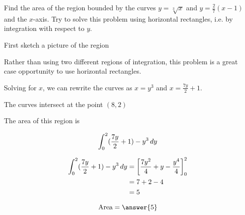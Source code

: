 \documentclass[handout]{ximera}
\begin{document}
\begin{exercise}
Find the area of the region bounded by the curves $y=\sqrt[3]{x}$ and $y=\frac{2}{7}(x-1)$ and the $x$-axis.  Try to solve this problem using horizontal rectangles, i.e. by integration with respect to $y$.

\begin{hint}

	First sketch a picture of the region

\begin{image}
\end{image}
\end{hint}

\begin{hint}
Rather than using two different regions of integration, this problem is a great case opportunity to use horizontal rectangles.

Solving for $x$, we can rewrite the curves as $x = y^3$ and $x = \frac{7y}{2}+1$.

The curves intersect at the point $(8,2)$
\end{hint}

\begin{hint}
	The area of this region is

	\[
	\int_{0}^{2} ( \frac{7y}{2}+1)-y^3 \mathop{}\!d y
	\]
\end{hint}

\begin{hint}


	\begin{align*}
		\int_{0}^{2} ( \frac{7y}{2}+1)-y^3 \mathop{}\!d y &=  \bigg[ \frac{7y^2}{4}+y-\frac{y^4}{4} \bigg]_0^2\\
		&= 7+2-4\\
		&= 5
	\end{align*}

	
\end{hint}

	\[
		\textrm{Area} = \answer{5}
	\]

\end{exercise}
\end{document}
